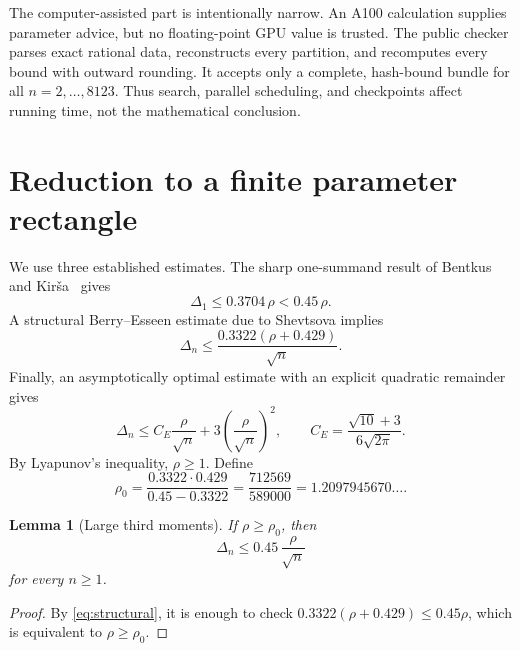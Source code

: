 \documentclass[11pt,a4paper,twoside]{article}
\newcommand{\manualtag}[1]{\tag{#1}}
\newtheorem{lemma}[theorem]{Lemma}
\theoremstyle{remark}
\newcommand{\rhozero}{\rho_{0}}
\begin{document}
The computer-assisted part is intentionally narrow.  An A100 calculation
supplies parameter advice, but no floating-point GPU value is trusted.
The public checker parses exact rational data, reconstructs every partition,
and recomputes every bound with outward rounding.  It accepts only a complete,
hash-bound bundle for all \(n=2,\ldots,8123\).  Thus search, parallel
scheduling, and checkpoints affect running time, not the mathematical
conclusion.

\section{Reduction to a finite parameter rectangle}

We use three established estimates.  The sharp one-summand result of Bentkus
and Kir\v{s}a~\cite{BentkusKirsa1989} gives
\begin{equation}
 \Delta_1\le 0.3704\,\rho<0.45\,\rho.
 \manualtag{1}\label{eq:one-summand}
\end{equation}
A structural Berry--Esseen estimate due to Shevtsova
\cite{Shevtsova2013} implies
\begin{equation}
 \Delta_n\le
 \frac{0.3322(\rho+0.429)}{\sqrt n}.
 \manualtag{2}\label{eq:structural}
\end{equation}
Finally, an asymptotically optimal estimate with an explicit quadratic
remainder~\cite{Shevtsova2012} gives
\begin{equation}
 \Delta_n\le
 C_E\frac{\rho}{\sqrt n}
 {}+3\left(\frac{\rho}{\sqrt n}\right)^2,
 \qquad
 C_E=\frac{\sqrt{10}+3}{6\sqrt{2\pi}}.
 \manualtag{3}\label{eq:asymptotic}
\end{equation}
By Lyapunov's inequality, \(\rho\ge1\).  Define
\begin{equation}
 \rhozero
 =
 \frac{0.3322\cdot0.429}{0.45-0.3322}
 =
 \frac{712569}{589000}
 =
 1.2097945670\ldots.
 \manualtag{4}\label{eq:rhozero}
\end{equation}

\begin{lemma}[Large third moments]\label{lem:large-rho}
If \(\rho\ge\rhozero\), then
\[
 \Delta_n\le0.45\,\frac{\rho}{\sqrt n}
\]
for every \(n\ge1\).
\end{lemma}

\begin{proof}
By \eqref{eq:structural}, it is enough to check
\(0.3322(\rho+0.429)\le0.45\rho\), which is equivalent to
\(\rho\ge\rhozero\).
\end{proof}
\end{document}
